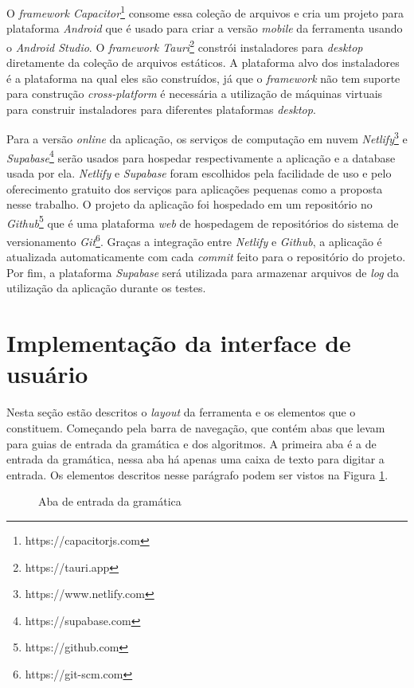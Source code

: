 O \textit{framework Capacitor}\footnote{https://capacitorjs.com} consome essa coleção de arquivos e cria um projeto para plataforma \textit{Android} que é usado para criar a versão \textit{mobile} da ferramenta usando o \textit{Android Studio}. O \textit{framework Tauri}\footnote{https://tauri.app} constrói instaladores para \textit{desktop} diretamente da coleção de arquivos estáticos. A plataforma alvo dos instaladores é a plataforma na qual eles são construídos, já que o \textit{framework} não tem suporte para construção \textit{cross-platform} é necessária a utilização de máquinas virtuais para construir instaladores para diferentes plataformas \textit{desktop}.

Para a versão \textit{online} da aplicação, os serviços  de computação em nuvem \textit{Netlify}\footnote{https://www.netlify.com} e \textit{Supabase}\footnote{https://supabase.com} serão usados para hospedar respectivamente a aplicação e a database usada por ela. \textit{Netlify} e \textit{Supabase} foram escolhidos pela facilidade de uso e pelo oferecimento gratuito dos serviços para aplicações pequenas como a proposta nesse trabalho. O projeto da aplicação foi hospedado em um repositório no \textit{Github}\footnote{https://github.com} que é uma plataforma \textit{web} de hospedagem de repositórios do sistema de versionamento \textit{Git}\footnote{https://git-scm.com}. Graças a integração entre \textit{Netlify} e \textit{Github}, a aplicação é atualizada automaticamente com cada \textit{commit} feito para o repositório do projeto. Por fim, a plataforma \textit{Supabase} será utilizada para armazenar arquivos de \textit{log} da utilização da aplicação durante os testes.

\section{Implementação da interface de usuário}
Nesta seção estão descritos o \textit{layout} da ferramenta e os elementos que o constituem. Começando pela barra de navegação, que contém abas que levam para guias de entrada da gramática e dos algoritmos. A primeira aba é a de entrada da gramática, nessa aba há apenas uma caixa de texto para digitar a entrada. Os elementos descritos nesse parágrafo podem ser vistos na Figura \ref{fig:mgrammar}.

\begin{figure}[ht]
  \centering
  \captionsetup{width=16cm}
  \caption{Aba de entrada da gramática}
  \label{fig:mgrammar}
\end{figure}

